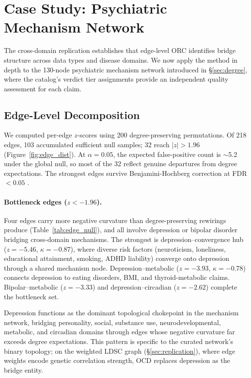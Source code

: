 \documentclass[11pt]{article}
\begin{document}
\section{Case Study: Psychiatric Mechanism Network}
\label{sec:casestudy}

The cross-domain replication establishes that edge-level ORC identifies bridge structure across data types and disease domains. We now apply the method in depth to the 130-node psychiatric mechanism network introduced in \S\ref{sec:degree}, where the catalog's verdict tier assignments provide an independent quality assessment for each claim.

\subsection{Edge-Level Decomposition}
\label{sec:edge}

We computed per-edge $z$-scores using 200 degree-preserving permutations. Of 218 edges, 103 accumulated sufficient null samples; 32 reach $|z| > 1.96$ (Figure~\ref{fig:edge_dist}). At $\alpha = 0.05$, the expected false-positive count is $\sim$5.2 under the global null, so most of the 32 reflect genuine departures from degree expectations. The strongest edges survive Benjamini-Hochberg correction at FDR $< 0.05$ \citep{benjamini1995controlling}.

\paragraph{Bottleneck edges ($z < -1.96$).} Four edges carry more negative curvature than degree-preserving rewirings produce (Table~\ref{tab:edge_null}), and all involve depression or bipolar disorder bridging cross-domain mechanisms. The strongest is depression--convergence hub ($z = -5.46$, $\kappa = -0.87$), where diverse risk factors (neuroticism, loneliness, educational attainment, smoking, ADHD liability) converge onto depression through a shared mechanism node. Depression--metabolic ($z = -3.93$, $\kappa = -0.78$) connects depression to eating disorders, BMI, and thyroid-metabolic claims. Bipolar--metabolic ($z = -3.33$) and depression--circadian ($z = -2.62$) complete the bottleneck set.

Depression functions as the dominant topological chokepoint in the mechanism network, bridging personality, social, substance use, neurodevelopmental, metabolic, and circadian domains through edges whose negative curvature far exceeds degree expectations. This pattern is specific to the curated network's binary topology; on the weighted LDSC graph (\S\ref{sec:replication}), where edge weights encode genetic correlation strength, OCD replaces depression as the bridge entity.
\end{document}

